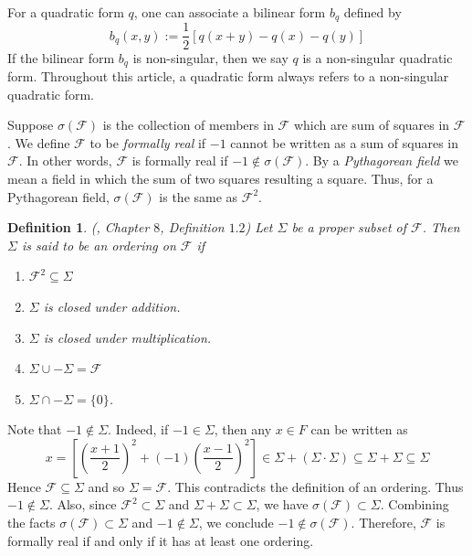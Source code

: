 \documentclass[sn-mathphys-num]{sn-jnl}%
\newtheorem{definition}[theorem]{Definition}
\begin{document}
For a quadratic form $q$, one can associate a bilinear form $b_q$ defined by \[b_q(x,y):=\frac{1}{2}[q(x+y)-q(x)-q(y)]\] 
If the bilinear form $b_q$ is non-singular, then we say $q$ is a { non-singular} quadratic form. Throughout this article, a quadratic form always refers to a non-singular quadratic form.

\medskip 

Suppose $\sigma(\mathcal F)$ is the collection of members in $\mathcal F$ which are sum of squares in $\mathcal F$. We define $\mathcal F$ to be {\it formally real} if $-1$ cannot be written as a sum of squares in $\mathcal F$. In other words, $\mathcal F$ is formally real if $-1 \notin \sigma(\mathcal F)$. By a {\it Pythagorean field} we mean a field in which the sum of two squares resulting a square. Thus, for a Pythagorean field, $\sigma(\mathcal F)$ is the same as $\mathcal F^2$.
\medskip 

\begin{definition} (\cite{lam}, Chapter $8$, Definition $1.2$)
Let $\Sigma$ be a proper subset of $\mathcal F$. Then $\Sigma$ is said to be an ordering on $\mathcal F$ if 
\begin{enumerate}
    \item $\mathcal F^2\subseteq \Sigma$
    \item $\Sigma$ is closed under addition.
    \item $\Sigma$ is closed under multiplication.
    \item $\Sigma \cup -\Sigma=\mathcal F$
    \item $\Sigma \cap -\Sigma=\{0\}$.
\end{enumerate}
\end{definition}

Note that $-1 \notin \Sigma$. Indeed, if $-1 \in \Sigma$, then any $x \in F$ can be written as \[x=\left[\left(\frac{x+1}{2}\right)^2+(-1)\left(\frac{x-1}{2}\right)^2 \right] \in \Sigma+(\Sigma\cdot \Sigma) \subseteq \Sigma+\Sigma \subseteq \Sigma\]
Hence $\mathcal F \subseteq \Sigma$ and so $\Sigma=\mathcal F$. This contradicts the definition of an ordering.
Thus $-1 \notin \Sigma$. Also, since $\mathcal F^2 \subset \Sigma$ and $\Sigma+\Sigma \subset \Sigma$, we have $\sigma(\mathcal F) \subset \Sigma$. Combining the facts $\sigma(\mathcal F) \subset \Sigma$ and  $-1 \notin \Sigma$, we conclude $-1 \notin \sigma(\mathcal F)$. Therefore, $\mathcal F$ is formally real if and only if it has at least one ordering.
\end{document}
